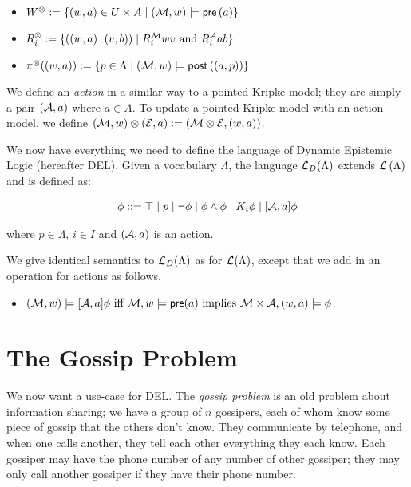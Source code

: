 \documentclass[12pt, a4paper]{article} %
\begin{document}
\begin{itemize}
    \item $W^\otimes := \{\left(w, a\right) \in U \times A \mid \left(\mathcal{M}, w\right) \models \textsf{pre}\left(a\right)\}$

    \item $R^\otimes_i := \{\left(\left(w, a\right), \left(v, b\right)\right) \mid R^{\mathcal{M}}_i wv \text{ and } R^{\mathcal{A}}_i ab\}$

    \item $\pi^\otimes((w, a)) := \{p\in\Lambda \mid \left(\mathcal{M}, w\right) \models \textsf{post}\left(\left(a, p\right)\right) \}$
\end{itemize}

We define an \textit{action} in a similar way to a pointed Kripke model; they are simply a pair $\left(\mathcal{A}, a\right)$ where $a \in A$. To update a pointed Kripke model with an action model, we define $(\mathcal{M}, w) \otimes (\mathcal{E}, a) := (\mathcal{M} \otimes \mathcal{E}, (w, a))$.

\hfill

We now have everything we need to define the language of Dynamic Epistemic Logic (hereafter DEL). Given a vocabulary $\Lambda$, the language $\mathcal{L}_D(\Lambda)$ extends $\mathcal{L} \left(\Lambda\right)$ and is defined as:

\begin{align}
    \phi ::= \top \mid p \mid \neg \phi \mid \phi \land \phi \mid K_i \phi \mid [\mathcal{A}, a]\phi
\end{align}

\noindent where $p \in \Lambda$, $i \in I$ and $(\mathcal{A}, a)$ is an action.

We give identical semantics to $\mathcal{L}_D(\Lambda)$ as for $\mathcal{L}(\Lambda)$, except that we add in an operation for actions as follows.

\begin{itemize}
    \item $(\mathcal{M}, w) \models [\mathcal{A}, a]\phi \text{ iff } \mathcal{M}, w \models \textsf{pre} (a) \text{ implies } \mathcal{M} \times \mathcal{A}, (w, a) \models \phi$.
\end{itemize}   

\section{The Gossip Problem}

We now want a use-case for DEL. The \textit{gossip problem} is an old problem about information sharing; we have a group of $n$ gossipers, each of whom know some piece of gossip that the others don't know. They communicate by telephone, and when one calls another, they tell each other everything they each know. Each gossiper may have the phone number of any number of other gossiper; they may only call another gossiper if they have their phone number. 
\end{document}

